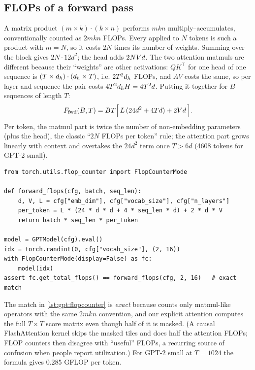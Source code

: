 \subsection{FLOPs of a forward pass}
A matrix product $(m\times k)\cdot(k\times n)$ performs $mkn$ multiply--accumulates, conventionally
counted as $2mkn$ FLOPs. Every  applied to $N$ tokens is such a product with
$m=N$, so it costs $2N$ times its number of weights. Summing over the block gives $2N\cdot12d^2$; the
head adds $2NV d$. The two attention matmuls are different because their ``weights'' are other
activations: $QK^\top$ for one head of one sequence is $(T\times d_{h})\cdot(d_{h}\times T)$, i.e.
$2T^2d_{h}$ FLOPs, and $AV$ costs the same, so per layer and sequence the pair costs
$4T^2d_{h} H = 4T^2 d$. Putting it together for $B$ sequences of length $T$:
\begin{equation}
F_\text{fwd}(B,T) = BT\Big[\,L\,(24d^2 + 4Td) + 2V d\,\Big].
\label{eq:gpt:flops}
\end{equation}
Per token, the matmul part is twice the number of non-embedding parameters (plus the head), the
classic ``$2N$ FLOPs per token'' rule; the attention part grows linearly with context and overtakes
the $24d^2$ term once $T>6d$ (4608 tokens for GPT-2 small).

\begin{lstlisting}[caption={Verifying \cref{eq:gpt:flops} against PyTorch's own FLOP counter.},label={lst:gpt:flopcounter}]
from torch.utils.flop_counter import FlopCounterMode

def forward_flops(cfg, batch, seq_len):
    d, V, L = cfg["emb_dim"], cfg["vocab_size"], cfg["n_layers"]
    per_token = L * (24 * d * d + 4 * seq_len * d) + 2 * d * V
    return batch * seq_len * per_token

model = GPTModel(cfg).eval()
idx = torch.randint(0, cfg["vocab_size"], (2, 16))
with FlopCounterMode(display=False) as fc:
    model(idx)
assert fc.get_total_flops() == forward_flops(cfg, 2, 16)   # exact match
\end{lstlisting}

The match in \cref{lst:gpt:flopcounter} is \emph{exact} because  counts only
matmul-like operators with the same $2mkn$ convention, and our explicit attention computes the full
$T\times T$ score matrix even though half of it is masked. (A causal FlashAttention kernel skips the
masked tiles and does half the attention FLOPs; FLOP counters then disagree with ``useful'' FLOPs, a
recurring source of confusion when people report utilization.) For GPT-2 small at $T=1024$ the
formula gives 0.285 GFLOP per token.

